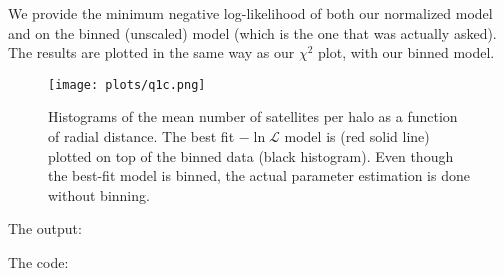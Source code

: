 We provide the minimum negative log-likelihood of both our normalized model and on the binned (unscaled) model (which is the one that was actually asked).
The results are plotted in the same way as our $\chi^2$ plot, with our binned model.

\begin{figure}[H]
    \centering
    \texttt{[image: plots/q1c.png]}
    \caption{Histograms of the mean number of satellites per halo as a function of radial distance. The best fit $-\ln \mathcal{L}$ model is
    (red solid line) plotted on top of the binned data (black histogram). Even though the best-fit model is binned, the actual parameter estimation is
    done without binning.
    }
\end{figure}

\noindent The output:



\noindent The code:

